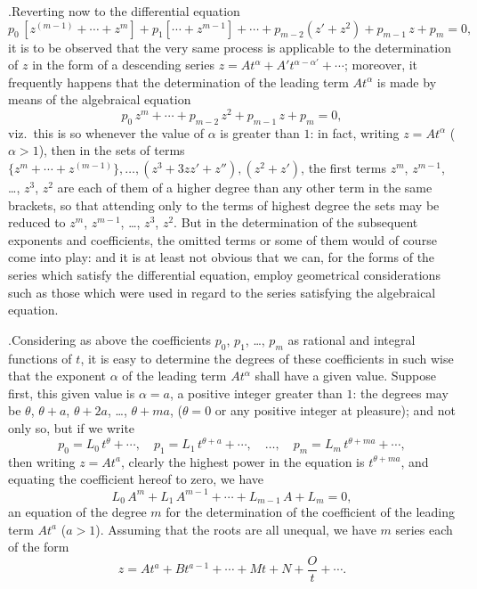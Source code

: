 \documentclass[11pt]{article}
\begin{document}
.\quad Reverting now to the differential equation
\[
p_{0}\,[z^{(m-1)} + \cdots + z^{m}] + p_{1}[\cdots + z^{m-1}] + \cdots + p_{m-2}(z' + z^{2}) + p_{m-1}\,z + p_{m} = 0,
\]
it is to be observed that the very same process is applicable to the determination of $z$ in the form of a descending series $z = At^{\alpha} + A't^{\alpha-\alpha'} + \cdots$; moreover, it frequently happens that the determination of the leading term $At^{\alpha}$ is made by means of the algebraical equation
\[
p_{0}\,z^{m} + \cdots + p_{m-2}\,z^{2} + p_{m-1}\,z + p_{m} = 0,
\]
viz.\ this is so whenever the value of $\alpha$ is greater than $1$: in fact, writing $z = At^{\alpha}$ ($\alpha > 1$), then in the sets of terms $\{z^{m} + \cdots + z^{(m-1)}\}, \ldots, (z^{3} + 3zz' + z''), (z^{2} + z')$, the first terms $z^{m}$, $z^{m-1}$, \ldots, $z^{3}$, $z^{2}$ are each of them of a higher degree than any other term in the same brackets, so that attending only to the terms of highest degree the sets may be reduced to $z^{m}$, $z^{m-1}$, \ldots, $z^{3}$, $z^{2}$. But in the determination of the subsequent exponents and coefficients, the omitted terms or some of them would of course come into play: and it is at least not obvious that we can, for the forms of the series which satisfy the differential equation, employ geometrical considerations such as those which were used in regard to the series satisfying the algebraical equation.

\medskip

.\quad Considering as above the coefficients $p_{0}$, $p_{1}$, \ldots, $p_{m}$ as rational and integral functions of $t$, it is easy to determine the degrees of these coefficients in such wise that the exponent $\alpha$ of the leading term $At^{\alpha}$ shall have a given value. Suppose first, this given value is $\alpha = a$, a positive integer greater than $1$: the degrees may be $\theta$, $\theta + a$, $\theta + 2a$, \ldots, $\theta + ma$, ($\theta = 0$ or any positive integer at pleasure); and not only so, but if we write
\[
p_{0} = L_{0}\,t^{\theta} + \cdots,\quad p_{1} = L_{1}\,t^{\theta+a} + \cdots,\quad \ldots,\quad p_{m} = L_{m}\,t^{\theta+ma} + \cdots,
\]
then writing $z = At^{a}$, clearly the highest power in the equation is $t^{\theta + ma}$, and equating the coefficient hereof to zero, we have
\[
L_{0}\,A^{m} + L_{1}\,A^{m-1} + \cdots + L_{m-1}\,A + L_{m} = 0,
\]
an equation of the degree $m$ for the determination of the coefficient of the leading term $At^{a}$ ($a > 1$). Assuming that the roots are all unequal, we have $m$ series each of the form
\[
z = At^{a} + Bt^{a-1} + \cdots + Mt + N + \frac{O}{t} + \cdots.
\]
\end{document}
